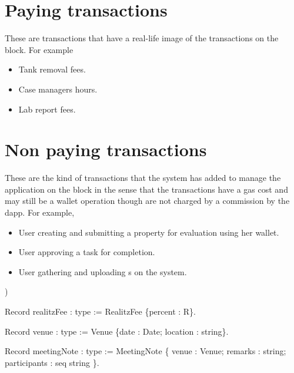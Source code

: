 \documentclass[12pt]{report}
\begin{document}
\section{Paying transactions}


  These are transactions that have a real-life image of the transactions on the block. For example

\begin{itemize}
\item  Tank removal fees.

\item  Case managers hours.

\item  Lab report fees.

\end{itemize}


\section{Non paying transactions}


  These are the kind of transactions that the system has added to manage the application on 
  the block in the sense that the transactions have a gas cost and may still be a wallet operation
  though are not charged by a commission by the dapp. For example, 

\begin{itemize}
\item  User creating and submitting a property for evaluation using her wallet.

\item  User approving a task for completion.

\item  User gathering and uploading s on the system.

\end{itemize}
)


Record realitzFee : type := RealitzFee \{percent : R\}.


Record venue : type := Venue \{date : Date; location : string\}.


Record meetingNote : type := MeetingNote \{
  venue : Venue;
  remarks : string;
    participants : seq string
  \}.\begin{coqdoccode}
\end{coqdoccode}
\end{document}
